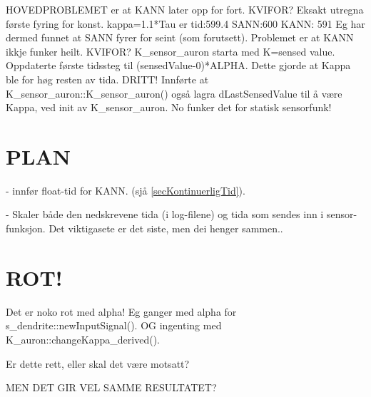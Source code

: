 	HOVEDPROBLEMET er at KANN later opp for fort. KVIFOR? Eksakt utregna første fyring for konst. kappa=1.1*Tau er tid:599.4  
	SANN:600 	KANN: 591
	Eg har dermed funnet at SANN fyrer for seint (som forutsett). Problemet er at KANN ikkje funker heilt. KVIFOR?
	K_sensor_auron starta med K=sensed value. Oppdaterte første tidssteg til (sensedValue-0)*ALPHA. Dette gjorde at Kappa ble for høg resten av tida. DRITT!
	Innførte at K_sensor_auron::K_sensor_auron() også lagra dLastSensedValue til å være Kappa, ved init av K_sensor_auron. No funker det for statisk sensorfunk!

\section{PLAN}
	- innfør float-tid for KANN. (sjå \ref{secKontinuerligTid}).

	- Skaler både den nedskrevene tida (i log-filene) og tida som sendes inn i sensor-funksjon. Det viktigasete er det siste, men dei henger sammen..

\section{ROT!}
Det er noko rot med alpha! Eg ganger med alpha for s\_dendrite::newInputSignal(). OG ingenting med K\_auron::changeKappa\_derived().

Er dette rett, eller skal det være motsatt?

MEN DET GIR VEL SAMME RESULTATET?
